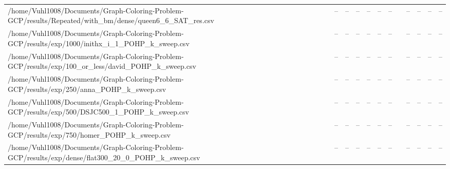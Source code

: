 \begin{table}[htbp]
\begin{tabular}{llllllllllll}
/home/Vuhl1008/Documents/Graph-Coloring-Problem-GCP/results/Repeated/with\_bm/dense/queen6\_6\_SAT\_res.csv & -- & -- & -- & -- & -- & -- & {} & -- & -- & -- & -- \\
/home/Vuhl1008/Documents/Graph-Coloring-Problem-GCP/results/exp/1000/inithx\_i\_1\_POHP\_k\_sweep.csv & -- & -- & -- & -- & -- & -- & {} & -- & -- & -- & -- \\
/home/Vuhl1008/Documents/Graph-Coloring-Problem-GCP/results/exp/100\_or\_less/david\_POHP\_k\_sweep.csv & -- & -- & -- & -- & -- & -- & {} & -- & -- & -- & -- \\
/home/Vuhl1008/Documents/Graph-Coloring-Problem-GCP/results/exp/250/anna\_POHP\_k\_sweep.csv & -- & -- & -- & -- & -- & -- & {} & -- & -- & -- & -- \\
/home/Vuhl1008/Documents/Graph-Coloring-Problem-GCP/results/exp/500/DSJC500\_1\_POHP\_k\_sweep.csv & -- & -- & -- & -- & -- & -- & {} & -- & -- & -- & -- \\
/home/Vuhl1008/Documents/Graph-Coloring-Problem-GCP/results/exp/750/homer\_POHP\_k\_sweep.csv & -- & -- & -- & -- & -- & -- & {} & -- & -- & -- & -- \\
/home/Vuhl1008/Documents/Graph-Coloring-Problem-GCP/results/exp/dense/flat300\_20\_0\_POHP\_k\_sweep.csv & -- & -- & -- & -- & -- & -- & {} & -- & -- & -- & -- \\
\hline
\end{tabular}
\end{table}
